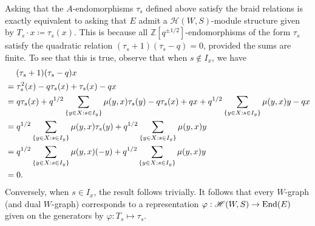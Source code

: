 \noindent Asking that the $A$-endomorphisms $\tau_s$ defined above satisfy the braid relations is exactly equivalent to asking that $E$ admit a $\mathscr{H}(W, S)$-module structure given by $T_s\cdot x \coloneqq \tau_s(x)$. This is because all $\mathbb{Z}[q^{\pm 1/2}]$-endomorphisms of the form $\tau_s$ satisfy the quadratic relation $(\tau_s + 1)(\tau_s - q) = 0$, provided the sums are finite. To see that this is true, observe that when $s \notin I_x$, we have
\begingroup
\begin{align*}
\begin{split}
&\hphantom{=\ \ \!} (\tau_s + 1)(\tau_s - q)x\\
&= \tau_s^2(x) - q\tau_s(x) + \tau_s(x) - qx\\
&= q\tau_s(x) + q^{1/2}\sum_{\{y \in X : s \in I_y\}} \mu(y, x)\tau_s(y) - q\tau_s(x) + qx + q^{1/2}\sum_{\{y \in X : s \in I_y\}} \mu(y, x)y - qx\\
&= q^{1/2}\sum_{\{y \in X : s \in I_y\}} \mu(y, x)\tau_s(y) + q^{1/2}\sum_{\{y \in X : s \in I_y\}} \mu(y, x)y\\
&= q^{1/2}\sum_{\{y \in X : s \in I_y\}} \mu(y, x)(-y) + q^{1/2}\sum_{\{y \in X : s \in I_y\}} \mu(y, x)y\\
&= 0.
\end{split}
\end{align*}
\endgroup
\noindent Conversely, when $s \in I_x$, the result follows trivially. It follows that every $W$-graph (and dual $W$-graph) corresponds to a representation $\varphi : \mathscr{H}(W, S) \to \textup{End}(E)$ given on the generators by $\varphi : T_s \mapsto \tau_s$.\\

